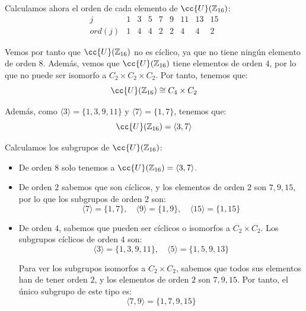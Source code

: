 \begin{ejemplo}
    Calculamos ahora el orden de cada elemento de $\cc{U}(\mathbb{Z}_{16})$:
    \begin{equation*}
        \begin{array}{c|cccccccc}
            j & 1 & 3 & 5 & 7 & 9 & 11 & 13 & 15 \\
            \hline
            ord(j) & 1 & 4 & 4 & 2 & 2 & 4 & 4 & 2
        \end{array}
    \end{equation*}

    Vemos por tanto que $\cc{U}(\mathbb{Z}_{16})$ no es cíclico, ya que no tiene ningún elemento de orden $8$. Además, vemos que $\cc{U}(\mathbb{Z}_{16})$ tiene elementos de orden $4$, por lo que no puede ser isomorfo a $C_2\times C_2\times C_2$. Por tanto, tenemos que:
    \begin{equation*}
        \cc{U}(\mathbb{Z}_{16}) \cong C_4\times C_2
    \end{equation*}

    Además, como $\langle 3\rangle = \{1,3,9,11\}$ y $\langle 7\rangle = \{1,7\}$, tenemos que:
    \begin{equation*}
        \cc{U}(\mathbb{Z}_{16}) = \langle 3,7\rangle
    \end{equation*}
    
    Calculamos los subgrupos de $\cc{U}(\mathbb{Z}_{16})$:
    \begin{itemize}
        \item De orden $8$ solo tenemos a $\cc{U}(\mathbb{Z}_{16})=\langle 3,7\rangle$.
        \item De orden $2$ sabemos que son cíclicos, y los elementos de orden $2$ son $7,9,15$, por lo que los subgrupos de orden $2$ son:
            \begin{equation*}
                \langle 7\rangle = \{1,7\},\quad \langle 9\rangle = \{1,9\},\quad \langle 15\rangle = \{1,15\}
            \end{equation*}
        \item De orden $4$, sabemos que pueden ser cíclicos o isomorfos a $C_2\times C_2$. Los subgrupos cíclicos de orden $4$ son:
            \begin{equation*}
                \langle 3\rangle = \{1,3,9,11\},\quad \langle 5\rangle = \{1,5,9,13\}
            \end{equation*}
            
            Para ver los subgrupos isomorfos a $C_2\times C_2$, sabemos que todos sus elementos han de tener orden $2$, y los elementos de orden $2$ son $7,9,15$. Por tanto, el único subgrupo de este tipo es:
            \begin{equation*}
                \langle 7,9\rangle = \{1,7,9,15\}
            \end{equation*}
    \end{itemize}


\end{ejemplo}
